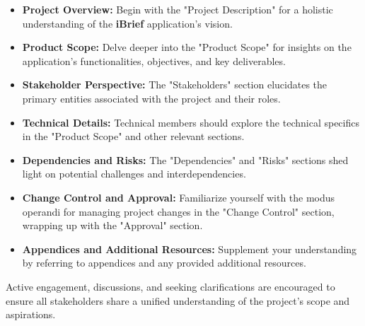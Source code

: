     \begin{itemize}
        \item \textbf{Project Overview:} Begin with the "Project Description" for a holistic understanding of the \textbf{iBrief} application's vision.
        
        \item \textbf{Product Scope:} Delve deeper into the "Product Scope" for insights on the application's functionalities, objectives, and key deliverables.
        
        \item \textbf{Stakeholder Perspective:} The "Stakeholders" section elucidates the primary entities associated with the project and their roles.
        
        \item \textbf{Technical Details:} Technical members should explore the technical specifics in the "Product Scope" and other relevant sections.
        
        \item \textbf{Dependencies and Risks:} The "Dependencies" and "Risks" sections shed light on potential challenges and interdependencies.
        
        \item \textbf{Change Control and Approval:} Familiarize yourself with the modus operandi for managing project changes in the "Change Control" section, wrapping up with the "Approval" section.
        
        \item \textbf{Appendices and Additional Resources:} Supplement your understanding by referring to appendices and any provided additional resources.
    \end{itemize}
    
Active engagement, discussions, and seeking clarifications are encouraged to ensure all stakeholders share a unified understanding of the project's scope and aspirations.

